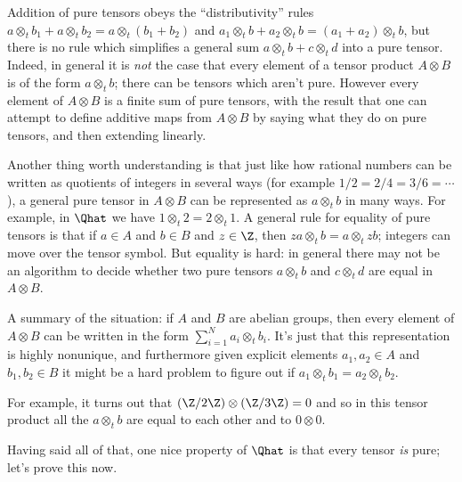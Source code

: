 Addition of pure tensors obeys the ``distributivity'' rules
$a\otimes_t b_1+a\otimes_t b_2=a\otimes_t(b_1+b_2)$ and
$a_1\otimes_t b+a_2\otimes_t b=(a_1+a_2)\otimes_t b$, but there is no rule which simplifies
a general sum $a\otimes_t b + c\otimes_t d$ into a pure tensor. Indeed, in general it is \emph{not}
the case that every element of a tensor product $A\otimes B$ is of the form $a\otimes_t b$; there can be
tensors which aren't pure. However every element of $A\otimes B$ is a finite sum of pure tensors,
with the result that one can attempt to define additive maps from $A\otimes B$ by saying what they
do on pure tensors, and then extending linearly.

Another thing worth understanding is that just like how rational numbers can be written as
quotients of integers in several ways (for example $1/2=2/4=3/6=\cdots$), a general pure tensor
in $A\otimes B$ can be represented as $a\otimes_t b$ in many ways. For example, in $\Qhat$
we have $1\otimes_t 2=2\otimes_t 1$. A general rule for equality of pure tensors is that if
$a\in A$ and $b\in B$ and $z\in\Z$, then $za\otimes_tb=a\otimes_tzb$; integers can move over the
tensor symbol. But equality is hard: in general there may not be an algorithm to decide
whether two pure tensors $a\otimes_t b$ and $c\otimes_t d$ are equal in $A\otimes B$.

\begin{remark} A summary of the situation: if $A$ and $B$ are abelian groups, then every element
    of $A\otimes B$ can be written in the form $\sum_{i=1}^Na_i\otimes_tb_i$. It's just that this
    representation is highly nonunique, and furthermore given explicit elements $a_1,a_2\in A$
    and $b_1,b_2\in B$ it might be a hard problem to figure out if
    $a_1\otimes_t b_1=a_2\otimes_t b_2$.

    For example, it turns out that $(\Z/2\Z)\otimes(\Z/3\Z)=0$
    and so in this tensor product all the $a\otimes_t b$ are equal to each other and to $0\otimes 0$.
\end{remark}

Having said all of that, one nice property of $\Qhat$ is that every tensor \emph{is} pure;
let's prove this now.

